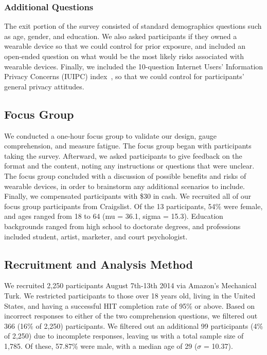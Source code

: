 \documentclass{acm_proc_article-sp}
\begin{document}
\subsubsection{Additional Questions}
The exit portion of the survey consisted of standard demographics questions such as age, gender, and education. We also asked participants if they owned a wearable device so that we could control for prior exposure, and included an open-ended question on what would be the most likely risks associated with wearable devices. Finally, we included the 10-question Internet Users' Information Privacy Concerns (IUIPC) index~\cite{malhotra2004internet}, so that we could control for participants' general privacy attitudes.

\subsection{Focus Group}
We conducted a one-hour focus group to validate our design, gauge comprehension, and measure fatigue. The focus group began with participants taking the survey. Afterward, we asked participants to give feedback on the format and the content, noting any instructions or questions that were unclear. The focus group concluded with a discussion of possible benefits and risks of wearable devices, in order to brainstorm any additional scenarios to include. Finally, we compensated participants with \$30 in cash. We recruited all of our focus group participants from Craigslist. Of the 13 participants, 54\% were female, and ages ranged from 18 to 64 (mu = 36.1, sigma = 15.3).  Education backgrounds ranged from high school to doctorate degrees, and professions included student, artist, marketer, and court psychologist.

\subsection{Recruitment and Analysis Method}
We recruited 2,250 participants August 7th-13th 2014 via Amazon's Mechanical Turk. We restricted participants to those over 18 years old, living in the United States, and having a successful HIT completion rate of 95\% or above. Based on incorrect responses to either of the two comprehension questions, we filtered out 366 (16\% of 2,250) participants. We filtered out an additional 99 participants (4\% of 2,250) due to incomplete responses, leaving us with a total sample size of 1,785. Of these, 57.87\% were male, with a median age of 29 ($\sigma$ = 10.37).
\end{document}
